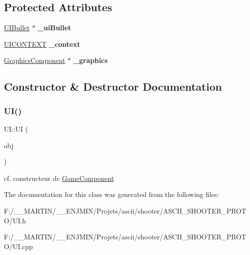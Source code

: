 \subsection*{Protected Attributes}
\begin{DoxyCompactItemize}
\item 
\hypertarget{class_u_i_aac95c488322f728b500db6d6b2c57ec4}{}\label{class_u_i_aac95c488322f728b500db6d6b2c57ec4} 
\hyperlink{class_u_i_bullet}{U\+I\+Bullet} $\ast$ {\bfseries \+\_\+ui\+Bullet}
\item 
\hypertarget{class_u_i_a6c660cea67e5c6f8c2e94a6f218e5589}{}\label{class_u_i_a6c660cea67e5c6f8c2e94a6f218e5589} 
\hyperlink{struct_u_i_c_o_n_t_e_x_t}{U\+I\+C\+O\+N\+T\+E\+XT} {\bfseries \+\_\+context}
\item 
\hypertarget{class_u_i_ad27cd3cd68f3ab9f8626dc855891ec39}{}\label{class_u_i_ad27cd3cd68f3ab9f8626dc855891ec39} 
\hyperlink{class_graphics_component}{Graphics\+Component} $\ast$ {\bfseries \+\_\+graphics}
\end{DoxyCompactItemize}


\subsection{Constructor \& Destructor Documentation}
\hypertarget{class_u_i_ab299e77b21896655f94ef84c727a4e22}{}\label{class_u_i_ab299e77b21896655f94ef84c727a4e22} 
\subsubsection{\texorpdfstring{U\+I()}{UI()}}
{\footnotesize\ttfamily U\+I\+::\+UI (\begin{DoxyParamCaption}\item[{\hyperlink{class_game_object}{Game\+Object} $\ast$}]{obj }\end{DoxyParamCaption})}

cf. constructeur de \hyperlink{class_game_component}{Game\+Component} 

The documentation for this class was generated from the following files\+:\begin{DoxyCompactItemize}
\item 
F\+:/\+\_\+\+\_\+\+M\+A\+R\+T\+I\+N/\+\_\+\+\_\+\+E\+N\+J\+M\+I\+N/\+Projets/ascii/shooter/\+A\+S\+C\+I\+I\+\_\+\+S\+H\+O\+O\+T\+E\+R\+\_\+\+P\+R\+O\+T\+O/U\+I.\+h\item 
F\+:/\+\_\+\+\_\+\+M\+A\+R\+T\+I\+N/\+\_\+\+\_\+\+E\+N\+J\+M\+I\+N/\+Projets/ascii/shooter/\+A\+S\+C\+I\+I\+\_\+\+S\+H\+O\+O\+T\+E\+R\+\_\+\+P\+R\+O\+T\+O/U\+I.\+cpp\end{DoxyCompactItemize}
